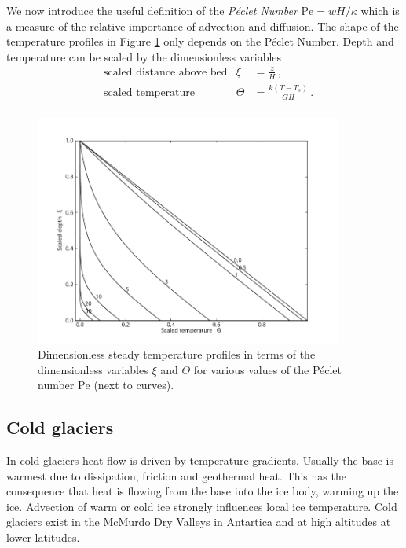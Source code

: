 \documentclass[parskip=half]{scrartcl}
\begin{document}
We now introduce the useful definition of the \emph{P{\'e}clet Number}
$\text{Pe} = w H/\kappa$ which is a measure of the relative importance
of advection and diffusion.  The shape of the temperature profiles in
Figure \ref{fig:advection-diffusion} only depends on the P{\'e}clet
Number.  Depth and temperature can be scaled by the dimensionless
variables
%
\begin{align*} &\text{scaled distance above bed} & \xi &=
\frac{z}{H}\,,\\ &\text{scaled temperature} & \Theta &= \frac{k
(T-T_s)}{G H}\,.\\
\end{align*}
%
\begin{figure}[tbhp] \centering
 \includegraphics[width=0.9\textwidth]{figures/advection-diffusion}
  \caption{Dimensionless steady temperature profiles in terms of the
dimensionless variables $\xi$ and $\Theta$ for various values of the
P{\'e}clet number $\mathrm{Pe}$ (next to curves). }
   \label{fig:advection-diffusion}
\end{figure}


\subsection{Cold glaciers}
\label{sec:cold-glaciers}

In cold glaciers heat flow is driven by temperature gradients.
Usually the base is warmest due to dissipation, friction and
geothermal heat.  This has the consequence that heat is flowing from
the base into the ice body, warming up the ice.  Advection of warm or
cold ice strongly influences local ice temperature. Cold glaciers
exist in the McMurdo Dry Valleys in Antartica and at high altitudes at
lower latitudes.
\end{document}
